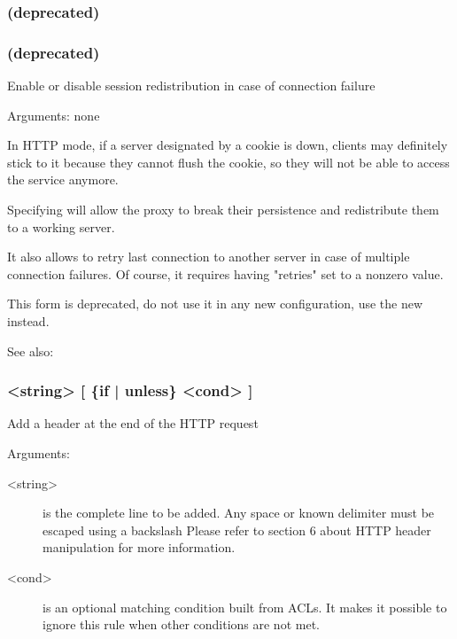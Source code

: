 \subsubsection[redisp]{ (deprecated)}
\subsubsection[redispatch]{ (deprecated)}

  Enable or disable session redistribution in case of connection failure


  Arguments: none

  In HTTP mode, if a server designated by a cookie is down, clients may
  definitely stick to it because they cannot flush the cookie, so they will not
  be able to access the service anymore.

  Specifying  will allow the proxy to break their persistence and
  redistribute them to a working server.

  It also allows to retry last connection to another server in case of multiple
  connection failures. Of course, it requires having "retries" set to a nonzero
  value.

  This form is deprecated, do not use it in any new configuration, use the new
   instead.


See also: 

\subsubsection[reqadd]{  <string> [ \{if | unless\} <cond> ]}


  Add a header at the end of the HTTP request


  Arguments:
  
\begin{description}
\item[<string>]
              is the complete line to be added. Any space or known delimiter
              must be escaped using a backslash \chr{\bslash} Please refer to section
              6 about HTTP header manipulation for more information.

\item[<cond>]
              is an optional matching condition built from ACLs. It makes it
              possible to ignore this rule when other conditions are not met.
\end{description}

